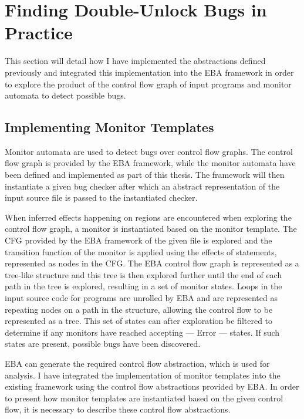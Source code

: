 \section{Finding Double-Unlock Bugs in Practice}
\label{implementation}

\noindent This section will detail how I have implemented the abstractions defined previously and integrated this implementation into the EBA framework in order to explore the product of the control flow graph of input programs and monitor automata to detect possible bugs. 

\subsection{Implementing Monitor Templates}
\newpar Monitor automata are used to detect bugs over control flow graphs. The control flow graph is provided by the EBA framework, while the monitor automata have been defined and implemented as part of this thesis. The framework will then instantiate a given bug checker after which an abstract representation of the input source file is passed to the instantiated checker. 

\newpar When inferred effects happening on regions are encountered when exploring the control flow graph, a monitor is instantiated based on the monitor template. The CFG provided by the EBA framework of the given file is explored and the transition function of the monitor is applied using the effects of statements, represented as nodes in the CFG. The EBA control flow graph is represented as a tree-like structure and this tree is then explored further until the end of each path in the tree is explored, resulting in a set of monitor states. Loops in the input source code for programs are unrolled by EBA and are represented as repeating nodes on a path in the structure, allowing the control flow to be represented as a tree. This set of states can after exploration be filtered to determine if any monitors have reached accepting --- Error --- states. If such states are present, possible bugs have been discovered. 

\newpar EBA can generate the required control flow abstraction, which is used for analysis. I have integrated the implementation of monitor templates into the existing framework using the control flow abstractions provided by EBA. In order to present how monitor templates are instantiated based on the given control flow, it is necessary to describe these control flow abstractions. 

